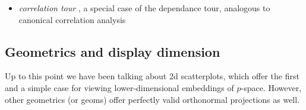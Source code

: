 \documentclass{monashthesis}
\begin{document}
\begin{itemize}
  \begin{itemize}
  \tightlist
  \item
    \emph{correlation tour} \autocite{buja_data_1987}, a special case of
    the dependance tour, analogous to canonical correlation analysis
  \end{itemize}
\end{itemize}

\subsection{Geometrics and display
dimension}\label{geometrics-and-display-dimension}

Up to this point we have been talking about 2d scatterplots, which offer
the first and a simple case for viewing lower-dimensional embeddings of
\(p\)-space. However, other geometrics (or geoms) offer perfectly valid
orthonormal projections as well.
\end{document}
